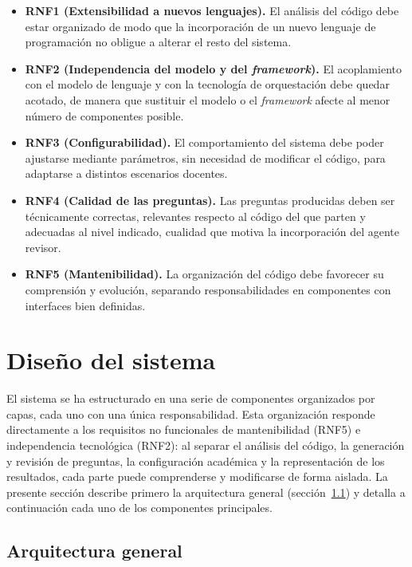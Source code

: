 \begin{itemize}
  \item \textbf{RNF1 (Extensibilidad a nuevos lenguajes).} El análisis
        del código debe estar organizado de modo que la incorporación de
        un nuevo lenguaje de programación no obligue a alterar el resto
        del sistema.
  \item \textbf{RNF2 (Independencia del modelo y del \emph{framework}).}
        El acoplamiento con el modelo de lenguaje y con la tecnología de
        orquestación debe quedar acotado, de manera que sustituir el
        modelo o el \emph{framework} afecte al menor número de
        componentes posible.
  \item \textbf{RNF3 (Configurabilidad).} El comportamiento del sistema
        debe poder ajustarse mediante parámetros, sin necesidad de
        modificar el código, para adaptarse a distintos escenarios
        docentes.
  \item \textbf{RNF4 (Calidad de las preguntas).} Las preguntas
        producidas deben ser técnicamente correctas, relevantes respecto
        al código del que parten y adecuadas al nivel indicado,
        cualidad que motiva la incorporación del agente revisor.
  \item \textbf{RNF5 (Mantenibilidad).} La organización del código debe
        favorecer su comprensión y evolución, separando responsabilidades
        en componentes con interfaces bien definidas.
\end{itemize}


\section{Diseño del sistema}
\label{sec:diseno}

El sistema se ha estructurado en una serie de componentes organizados por
capas, cada uno con una única responsabilidad. Esta
organización responde directamente a los requisitos no funcionales de
mantenibilidad (RNF5) e independencia tecnológica (RNF2): al separar el
análisis del código, la generación y revisión de preguntas, la
configuración académica y la representación de los resultados, cada parte
puede comprenderse y modificarse de forma aislada. La presente sección describe
primero la arquitectura general (sección~\ref{sec:arquitectura-general}) y
detalla a continuación cada uno de los componentes principales.

\subsection{Arquitectura general}
\label{sec:arquitectura-general}

